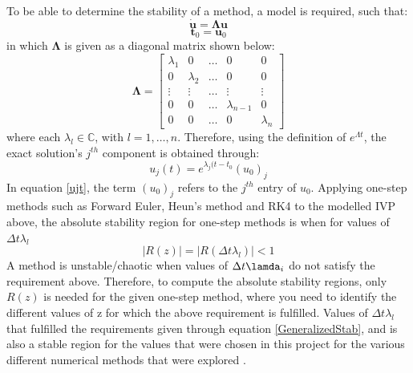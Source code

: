 \documentclass[conf]{new-aiaa}
\begin{document}
    To be able to determine the stability of a method, a model is required, such that\cite{LecAS}:
    \begin{equation}
        \bm{\dot{u}} = \bm{\Lambda u} \label{MIVP}
    \end{equation}
    \begin{equation}
        \bm{t}_0 = \bm{u}_0
    \end{equation}
    in which $\bm{\Lambda}$ is given as a diagonal matrix shown below:
    \begin{equation}
        \bm{\Lambda} = \begin{bmatrix}
        \lambda_1 & 0 & \hdots & 0 & 0\\
        0 & \lambda_2 & \hdots & 0 & 0\\
        \vdots & \vdots & \hdots & \vdots & \vdots\\
        0 & 0 & \hdots & \lambda_{n-1} & 0\\
        0 & 0 & \hdots & 0 & \lambda_n
        \end{bmatrix}
    \end{equation}
    where each $\lambda_l \in \mathbb{C}$, with $l = 1, \hdots,n$. Therefore, using the definition of $e^{\Lambda t}$, the exact solution's $j^{th}$ component is obtained through:
    \begin{equation}
        u_j(t) = e^{\lambda_j(t-t_0}(u_0)_j \label{ujt}
    \end{equation}
    In equation \eqref{ujt}, the term $(u_0)_j$ refers to the $j^{th}$ entry of $u_0$.
    Applying one-step methods such as Forward Euler, Heun's method and RK4 to the modelled IVP above, the absolute stability region for one-step methods is when for values of $\Delta t \lambda_{l}$ \cite{LecAS}
    \begin{equation}
        |R(z)| = |R(\Delta t \lambda_{l})| < 1 \label{GeneralizedStab}
    \end{equation}
    A method is unstable/chaotic when values of $\Delta t\lamda_{i}$ do not satisfy the requirement above. Therefore, to compute the absolute stability regions, only $R(z)$ is needed for the given one-step method, where you need to identify the different values of z for which the above requirement is fulfilled. Values of $\Delta t \lambda_l$ that fulfilled the requirements given through equation \eqref{GeneralizedStab}, and is also a stable region for the values that were chosen in this project for the various different numerical methods that were explored .
\end{document}
